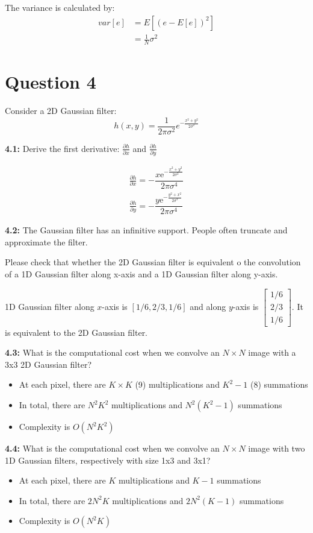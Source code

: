 \documentclass[12pt]{article}
\begin{document}
The variance is calculated by:
\begin{align*}
    var[e] &= E[(e - E[e])^2] \\ 
    &= \frac{1}{N} \sigma^2
\end{align*}

\section*{Question 4}

Consider a 2D Gaussian filter:
$$
    h(x, y) = \frac{1}{2\pi \sigma^2} e^{-\frac{x^2 + y^2}{2\sigma^2}}
$$

\textbf{4.1:} Derive the first derivative: $\frac{\partial h}{\partial x}$ and
$\frac{\partial h}{\partial y}$

\begin{align*}
    \frac{\partial h}{\partial x} = -\dfrac{x\mathrm{e}^{-\frac{x^2+y^2}{2{\sigma}^2}}}{2{\pi}{\sigma}^4} \\
    \frac{\partial h}{\partial y} = -\dfrac{y\mathrm{e}^{-\frac{y^2+x^2}{2{\sigma}^2}}}{2{\pi}{\sigma}^4}
\end{align*}

\textbf{4.2:} The Gaussian filter has an infinitive support. People often
truncate and approximate the filter. 

Please check that whether the 2D Gaussian filter is equivalent o the convolution
of a 1D Gaussian filter along x-axis and a 1D Gaussian filter along y-axis. 

1D Gaussian filter along $x$-axis is $[1/6, 2/3, 1/6]$ and along $y$-axis is $\begin{bmatrix}
    1/6 \\ 2/3 \\ 1/6
\end{bmatrix}$. It is equivalent to the 2D Gaussian filter. 

\textbf{4.3:} What is the computational cost when we convolve an $N \times N$
image with a 3x3 2D Gaussian filter?
\begin{itemize}
    \item At each pixel, there are $K \times K$ (9) multiplications and $K^2 -
    1$ (8) summations
    \item In total, there are $N^2K^2$ multiplications and $N^2(K^2 - 1)$
    summations 
    \item Complexity is $O(N^2 K^2)$
\end{itemize}

\textbf{4.4:} What is the computational cost when we convolve an $N \times N$
image with two 1D Gaussian filters, respectively with size 1x3 and 3x1? 
\begin{itemize}
    \item At each pixel, there are $K$ multiplications and $K - 1$ summations
    \item In total, there are $2 N^2K$ multiplications and $2 N^2(K - 1)$
    summations 
    \item Complexity is $O(N^2 K)$
\end{itemize}
\end{document}
